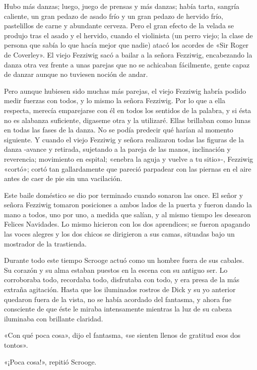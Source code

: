 \documentclass{novela}
\begin{document}
 Hubo más danzas; luego, juego de prensas y más danzas; había tarta, sangría caliente, un gran pedazo de asado frío y un gran pedazo de hervido frío, pastelillos de carne y abundante cerveza. Pero el gran efecto de la velada se produjo tras el asado y el hervido, cuando el violinista (un perro viejo; la clase de persona que sabía lo que hacía mejor que nadie) atacó los acordes de «Sir Roger de Coverley». El viejo Fezziwig sacó a bailar a la señora Fezziwig, encabezando la danza otra vez frente a unas parejas que no se achicaban fácilmente, gente capaz de danzar aunque no tuviesen noción de andar.

 Pero aunque hubiesen sido muchas más parejas, el viejo Fezziwig habría podido medir fuerzas con todos, y lo mismo la señora Fezziwig. Por lo que a ella respecta, merecía emparejarse con él en todos los sentidos de la palabra, y si ésta no es alabanza suficiente, digaseme otra y la utilizaré. Ellas brillaban como lunas en todas las fases de la danza. No se podía predecir qué harían al momento siguiente. Y cuando el viejo Fezziwig y señora realizaron todas las figuras de la danza -avance y retirada, sujetando a la pareja de las manos, inclinación y reverencia; movimiento en espital; «enebra la aguja y vuelve a tu sitio»-, Fezziwig «cortó»; cortó tan gallardamente que pareció parpadear con las piernas en el aire antes de caer de pie sin una vacilación.

 Este baile doméstico se dio por terminado cuando sonaron las once. El señor y señora Fezziwig tomaron posiciones a ambos lados de la puerta y fueron dando la mano a todos, uno por uno, a medida que salían, y al mismo tiempo les desearon Felices Navidades. Lo mismo hicieron con los dos aprendices; se fueron apagando las voces alegres y los dos chicos se dirigieron a sus camas, situadas bajo un mostrador de la trastienda.

 Durante todo este tiempo Scrooge actuó como un hombre fuera de sus cabales. Su corazón y su alma estaban puestos en la escena con su antiguo ser. Lo corroboraba todo, recordaba todo, disfrutaba con todo, y era presa de la más extraña agitación. Hasta que los iluminados rostros de Dick y su yo anterior quedaron fuera de la vista, no se había acordado del fantasma, y ahora fue consciente de que éste le miraba intensamente mientras la luz de su cabeza iluminaba con brillante claridad.

 «Con qué poca cosa», dijo el fantasma, «se sienten llenos de gratitud esos dos tontos».

 «¡Poca cosa!», repitió Scrooge.
\end{document}
